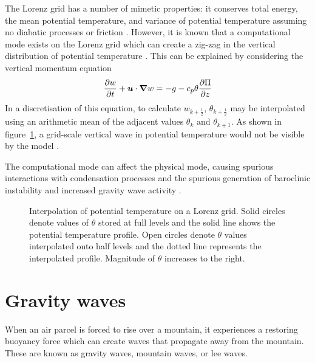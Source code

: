 The Lorenz grid has a number of mimetic properties: it conserves total energy, the mean potential temperature, and variance of potential temperature assuming no diabatic processes or friction \autocite{arakawa-konor1996}.  However, it is known that a computational mode exists on the Lorenz grid which can create a zig-zag in the vertical distribution of potential temperature \parencites{arakawa-moorthi1988}{arakawa-konor1996}{holdaway2013b}.  This can be explained by considering the vertical momentum equation \autocite{holdaway2013}
\begin{align}
	\frac{\partial w}{\partial t} + \bm{u} \cdot \boldsymbol{\nabla} w = -g - c_p \theta \frac{\partial \Pi}{\partial z}
\end{align}
In a discretisation of this equation, to calculate $w_{k+\frac{1}{2}}$, $\theta_{k+\frac{1}{2}}$ may be interpolated using an arithmetic mean of the adjacent values $\theta_k$ and $\theta_{k+1}$.  As shown in figure~\ref{fig:theory:theta-oscillation}, a grid-scale vertical wave in potential temperature would not be visible by the model \autocite{holdaway2013}.  

The computational mode can affect the physical mode, causing spurious interactions with condensation processes \autocite{arakawa-konor1996} and the spurious generation of baroclinic instability and increased gravity wave activity \parencites{arakawa-moorthi1988}{cullen1997}.

\begin{figure}
	\centering
	
	\caption{Interpolation of potential temperature on a Lorenz grid.  Solid circles denote values of $\theta$ stored at full levels and the solid line shows the potential temperature profile.  Open circles denote $\theta$ values interpolated onto half levels and the dotted line represents the interpolated profile.  Magnitude of $\theta$ increases to the right.}
	\label{fig:theory:theta-oscillation}
\end{figure}

\section{Gravity waves}
\label{sec:theory:gw}

When an air parcel is forced to rise over a mountain, it experiences a restoring buoyancy force which can create waves that propagate away from the mountain.  These are known as gravity waves, mountain waves, or lee waves.  

